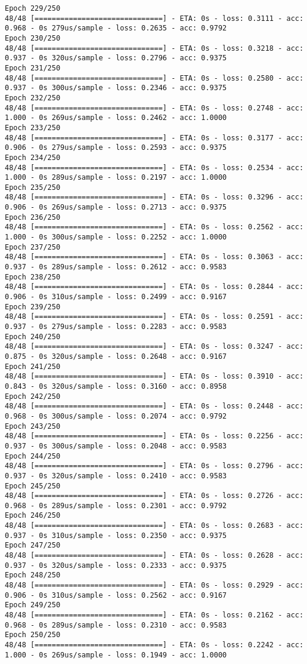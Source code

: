 \documentclass[11pt]{article}
\begin{document}
\begin{Verbatim}[commandchars=\\\{\}]
Epoch 229/250
48/48 [==============================] - ETA: 0s - loss: 0.3111 - acc: 0.968 - 0s 279us/sample - loss: 0.2635 - acc: 0.9792
Epoch 230/250
48/48 [==============================] - ETA: 0s - loss: 0.3218 - acc: 0.937 - 0s 320us/sample - loss: 0.2796 - acc: 0.9375
Epoch 231/250
48/48 [==============================] - ETA: 0s - loss: 0.2580 - acc: 0.937 - 0s 300us/sample - loss: 0.2346 - acc: 0.9375
Epoch 232/250
48/48 [==============================] - ETA: 0s - loss: 0.2748 - acc: 1.000 - 0s 269us/sample - loss: 0.2462 - acc: 1.0000
Epoch 233/250
48/48 [==============================] - ETA: 0s - loss: 0.3177 - acc: 0.906 - 0s 279us/sample - loss: 0.2593 - acc: 0.9375
Epoch 234/250
48/48 [==============================] - ETA: 0s - loss: 0.2534 - acc: 1.000 - 0s 289us/sample - loss: 0.2197 - acc: 1.0000
Epoch 235/250
48/48 [==============================] - ETA: 0s - loss: 0.3296 - acc: 0.906 - 0s 269us/sample - loss: 0.2713 - acc: 0.9375
Epoch 236/250
48/48 [==============================] - ETA: 0s - loss: 0.2562 - acc: 1.000 - 0s 300us/sample - loss: 0.2252 - acc: 1.0000
Epoch 237/250
48/48 [==============================] - ETA: 0s - loss: 0.3063 - acc: 0.937 - 0s 289us/sample - loss: 0.2612 - acc: 0.9583
Epoch 238/250
48/48 [==============================] - ETA: 0s - loss: 0.2844 - acc: 0.906 - 0s 310us/sample - loss: 0.2499 - acc: 0.9167
Epoch 239/250
48/48 [==============================] - ETA: 0s - loss: 0.2591 - acc: 0.937 - 0s 279us/sample - loss: 0.2283 - acc: 0.9583
Epoch 240/250
48/48 [==============================] - ETA: 0s - loss: 0.3247 - acc: 0.875 - 0s 320us/sample - loss: 0.2648 - acc: 0.9167
Epoch 241/250
48/48 [==============================] - ETA: 0s - loss: 0.3910 - acc: 0.843 - 0s 320us/sample - loss: 0.3160 - acc: 0.8958
Epoch 242/250
48/48 [==============================] - ETA: 0s - loss: 0.2448 - acc: 0.968 - 0s 300us/sample - loss: 0.2074 - acc: 0.9792
Epoch 243/250
48/48 [==============================] - ETA: 0s - loss: 0.2256 - acc: 0.937 - 0s 300us/sample - loss: 0.2048 - acc: 0.9583
Epoch 244/250
48/48 [==============================] - ETA: 0s - loss: 0.2796 - acc: 0.937 - 0s 320us/sample - loss: 0.2410 - acc: 0.9583
Epoch 245/250
48/48 [==============================] - ETA: 0s - loss: 0.2726 - acc: 0.968 - 0s 289us/sample - loss: 0.2301 - acc: 0.9792
Epoch 246/250
48/48 [==============================] - ETA: 0s - loss: 0.2683 - acc: 0.937 - 0s 310us/sample - loss: 0.2350 - acc: 0.9375
Epoch 247/250
48/48 [==============================] - ETA: 0s - loss: 0.2628 - acc: 0.937 - 0s 320us/sample - loss: 0.2333 - acc: 0.9375
Epoch 248/250
48/48 [==============================] - ETA: 0s - loss: 0.2929 - acc: 0.906 - 0s 310us/sample - loss: 0.2562 - acc: 0.9167
Epoch 249/250
48/48 [==============================] - ETA: 0s - loss: 0.2162 - acc: 0.968 - 0s 289us/sample - loss: 0.2310 - acc: 0.9583
Epoch 250/250
48/48 [==============================] - ETA: 0s - loss: 0.2242 - acc: 1.000 - 0s 269us/sample - loss: 0.1949 - acc: 1.0000

    \end{Verbatim}
\end{document}
